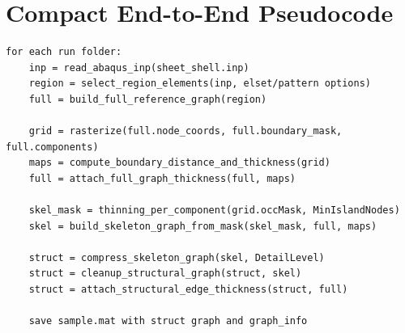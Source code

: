 \documentclass[11pt]{article}
\begin{document}
\section{Compact End-to-End Pseudocode}
\begin{verbatim}
for each run folder:
    inp = read_abaqus_inp(sheet_shell.inp)
    region = select_region_elements(inp, elset/pattern options)
    full = build_full_reference_graph(region)

    grid = rasterize(full.node_coords, full.boundary_mask, full.components)
    maps = compute_boundary_distance_and_thickness(grid)
    full = attach_full_graph_thickness(full, maps)

    skel_mask = thinning_per_component(grid.occMask, MinIslandNodes)
    skel = build_skeleton_graph_from_mask(skel_mask, full, maps)

    struct = compress_skeleton_graph(skel, DetailLevel)
    struct = cleanup_structural_graph(struct, skel)
    struct = attach_structural_edge_thickness(struct, full)

    save sample.mat with struct graph and graph_info
\end{verbatim}
\end{document}
